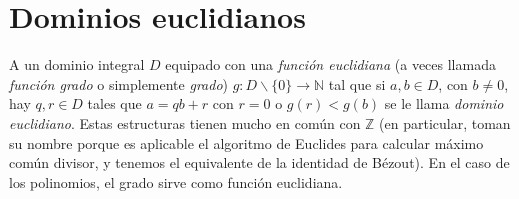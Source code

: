 %

\section{Dominios euclidianos}
\label{sec:dominios-euclidianos}

  A un dominio integral \(D\)
  equipado con una \emph{función euclidiana}
  (a veces llamada \emph{función grado} o simplemente \emph{grado})
  \(g \colon D \smallsetminus \{0\} \rightarrow \mathbb{N}\)
  tal que si \(a, b \in D\),
  con \(b \ne 0\),
  hay \(q, r \in D\)
  tales que \(a = q b + r\)
  con \(r = 0\) o \(g(r) < g(b)\)
  se le llama \emph{dominio euclidiano}.
  Estas estructuras tienen mucho en común con \(\mathbb{Z}\)
  (en particular,
   toman su nombre porque es aplicable el algoritmo de Euclides
   para calcular máximo común divisor,
   y tenemos el equivalente
   de la identidad de \foreignlanguage{french}{Bézout}).
  En el caso de los polinomios,
  el grado sirve como función euclidiana.

